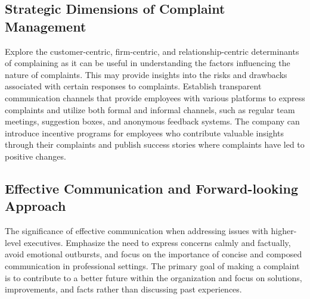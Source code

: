 \documentclass[a4paper,12pt]{article}
\begin{document}
\subsection{Strategic Dimensions of Complaint Management}
Explore the customer-centric, firm-centric, and relationship-centric determinants of complaining as it can be useful in understanding the factors influencing the nature of complaints. This may provide insights into the risks and drawbacks associated with certain responses to complaints\cite{opportunistic_complain}. Establish transparent communication channels that provide employees with various platforms to express complaints and utilize both formal and informal channels, such as regular team meetings, suggestion boxes, and anonymous feedback systems\cite{benefits_complain}. The company can introduce incentive programs for employees who contribute valuable insights through their complaints and publish success stories where complaints have led to positive changes.

\subsection{Effective Communication and Forward-looking Approach}
The significance of effective communication when addressing issues with higher-level executives. Emphasize the need to express concerns calmly and factually, avoid emotional outbursts, and focus on the importance of concise and composed communication in professional settings. \cite{complain_boss} The primary goal of making a complaint is to contribute to a better future within the organization and focus on solutions, improvements, and facts rather than discussing past experiences.

\newpage
\end{document}
